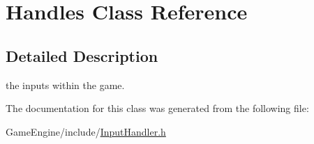 \hypertarget{class_handles}{}\section{Handles Class Reference}
\label{class_handles}


\subsection{Detailed Description}
the inputs within the game. 

The documentation for this class was generated from the following file\+:\begin{DoxyCompactItemize}
\item 
Game\+Engine/include/\mbox{\hyperlink{_input_handler_8h}{Input\+Handler.\+h}}\end{DoxyCompactItemize}
